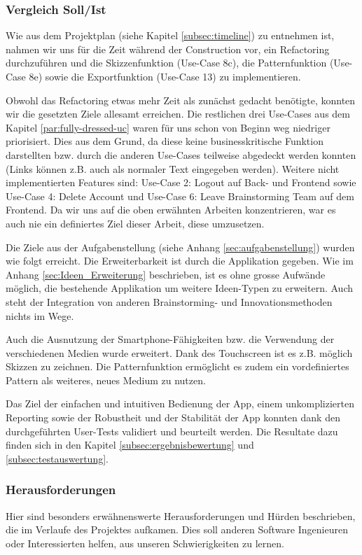 \subsubsection{Vergleich Soll/Ist}
Wie aus dem Projektplan (siehe Kapitel \ref{subsec:timeline}) zu entnehmen ist, nahmen wir uns für die Zeit während der Construction vor, ein Refactoring durchzuführen und die Skizzenfunktion (Use-Case 8c), die Patternfunktion (Use-Case 8e) sowie die Exportfunktion (Use-Case 13) zu implementieren. 

Obwohl das Refactoring etwas mehr Zeit als zunächst gedacht benötigte, konnten wir die gesetzten Ziele allesamt erreichen. Die restlichen drei Use-Cases aus dem Kapitel \ref{par:fully-dressed-uc} waren für uns schon von Beginn weg niedriger priorisiert. Dies aus dem Grund, da diese keine businesskritische Funktion darstellten bzw. durch die anderen Use-Cases teilweise abgedeckt werden konnten (Links können z.B. auch als normaler Text eingegeben werden). Weitere nicht implementierten Features sind: Use-Case 2: Logout auf Back- und Frontend sowie Use-Case 4: Delete Account und Use-Case 6: Leave Brainstorming Team auf dem Frontend. Da wir uns auf die oben erwähnten Arbeiten konzentrieren, war es auch nie ein definiertes Ziel dieser Arbeit, diese umzusetzen. 

Die Ziele aus der Aufgabenstellung (siehe Anhang \ref{sec:aufgabenstellung}) wurden wie folgt erreicht. Die Erweiterbarkeit ist durch die Applikation gegeben. Wie im Anhang \ref{sec:Ideen_Erweiterung} beschrieben, ist es ohne grosse Aufwände möglich, die bestehende Applikation um weitere Ideen-Typen zu erweitern. Auch steht der Integration von anderen Brainstorming- und Innovationsmethoden nichts im Wege.

Auch die Ausnutzung der Smartphone-Fähigkeiten bzw. die Verwendung der verschiedenen Medien wurde erweitert. Dank des Touchscreen ist es z.B. möglich Skizzen zu zeichnen. Die Patternfunktion ermöglicht es zudem ein vordefiniertes Pattern als weiteres, neues Medium zu nutzen.

Das Ziel der einfachen und intuitiven Bedienung der App, einem unkomplizierten Reporting sowie der Robustheit und der Stabilität der App konnten dank den durchgeführten User-Tests validiert und beurteilt werden. Die Resultate dazu finden sich in den Kapitel \ref{subsec:ergebnisbewertung} und \ref{subsec:testauswertung}.

\subsubsection{Herausforderungen}
\label{subsec:challenges}
Hier sind besonders erwähnenswerte Herausforderungen und Hürden beschrieben, die im Verlaufe des Projektes aufkamen. Dies soll anderen Software Ingenieuren oder Interessierten helfen, aus unseren Schwierigkeiten zu lernen. 


